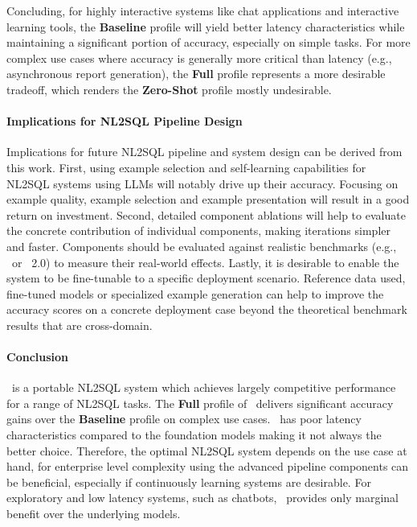 Concluding, for highly interactive systems like chat applications and
interactive learning tools, the \textbf{Baseline} profile will yield better
latency characteristics while maintaining a significant portion of accuracy,
especially on simple tasks. For more complex use cases where accuracy is
generally more critical than latency (e.g., asynchronous report generation), the
\textbf{Full} profile represents a more desirable tradeoff, which renders
the \textbf{Zero-Shot} profile mostly undesirable.

\paragraph{Implications for NL2SQL Pipeline Design}

Implications for future NL2SQL pipeline and system design can be
derived from this work. First, using example selection and self-learning
capabilities for NL2SQL systems using LLMs will notably drive up their
accuracy. Focusing on example quality, example selection and example
presentation will result in a good return on investment. Second, detailed
component ablations will help to evaluate the concrete contribution of
individual components, making iterations simpler and faster. Components should
be evaluated against realistic benchmarks (e.g., \Bird~or \Spider~2.0) to
measure their real-world effects. Lastly, it is desirable to enable the system
to be fine-tunable to a specific deployment scenario. Reference data used,
fine-tuned models or specialized example generation can help to improve the
accuracy scores on a concrete deployment case beyond the theoretical benchmark
results that are cross-domain.

\paragraph{Conclusion}

\Natural~is a portable NL2SQL system which achieves largely
competitive performance for a range of NL2SQL tasks. The \textbf{Full} profile
of \Natural~delivers significant accuracy gains over the \textbf{Baseline}
profile on complex use cases. \Natural~has poor latency characteristics
compared to the foundation models making it not always the better choice.
Therefore, the optimal NL2SQL system depends on the use case at hand, for
enterprise level complexity using the advanced pipeline components can be
beneficial, especially if continuously learning systems are desirable. For
exploratory and low latency systems, such as chatbots, \Natural~provides only
marginal benefit over the underlying models.

